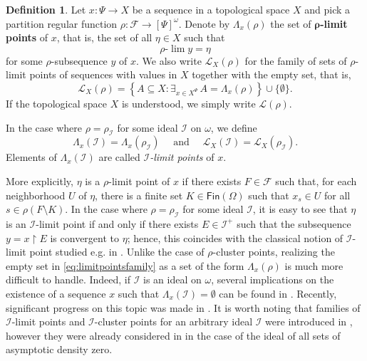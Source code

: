 \documentclass{amsart}
\theoremstyle{plain}
\theoremstyle{definition}
\newtheorem{defi}[thm]{Definition}
\theoremstyle{remark}
\newcommand{\cI}{\mathcal{I}}
\newcommand{\I}{\cI}
\newcommand{\FIN}{\mathsf{Fin}} \newcommand{\fin}{\FIN}
\newcommand{\Fin}{\FIN}
\begin{document}
\begin{defi}\label{defi:rholimitpoint}
Let $x: \Psi\to X$ be a sequence in a topological space $X$ 
and pick a partition regular function $\rho: \mathcal{F}\to [\Psi]^\omega$. 
Denote by 
$\Lambda_x(\rho)$ the set of $\bm{\rho}$\textbf{-limit points} of $x$, that is, the set of all $\eta \in X$ such that 
\begin{equation*}
    \rho\text{-}\lim y=\eta
\end{equation*}
for some $\rho$-subsequence $y$ of $x$. We also write $\mathscr{L}_X(\rho)$ for the family of sets of $\rho$-limit points of sequences with values in $X$ together with the empty set, that is, 
    \begin{equation}\label{eq:limitpointsfamily}
    \mathscr{L}_X(\rho)=\left\{A\subseteq X: \exists_{x \in X^\Psi}\, A=\Lambda_x(\rho)\right\}\cup \{\emptyset\}. 
    \end{equation}
    If the topological space $X$ is understood, we simply write $\mathscr{L}(\rho)$. 

In the case where $\rho=\rho_{\I}$ for some ideal $\I$ on $\omega$, we define 
\begin{equation*}
\Lambda_x(\I)=\Lambda_x(\rho_{\I})
\quad \text{ and }\quad 
\mathscr{L}_X(\I)=\mathscr{L}_X(\rho_{\I}).
\end{equation*}
Elements of $\Lambda_x(\I)$ are called $\I$\emph{-limit points} of $x$. 
\end{defi}

More explicitly, $\eta$ is a $\rho$-limit point of $x$ if there exists $F \in \mathcal{F}$ such that, for each neighborhood $U$ of $\eta$, there is a finite set $K \in \Fin(\Omega)$ such that $x_s \in U$ for all $s \in \rho(F\setminus K)$. In the case where $\rho=\rho_\I$ for some ideal $\I$, it is easy to see that $\eta$ is an $\I$-limit point 
if and only if there exists $E\in \I^+$ such that the subsequence $y=x\upharpoonright E$ is convergent to $\eta$; hence, this coincides with the classical notion of $\I$-limit point studied e.g. in \cite{MSP24, MR3883171, FKL24, MR3883170}. 
Unlike the case of $\rho$-cluster points, realizing the empty set 
in \eqref{eq:limitpointsfamily} 
as a set of the form $\Lambda_x(\rho)$ is much more difficult to handle. 
Indeed, if $\I$ is an ideal on $\omega$, several implications on the existence of a sequence $x$ such that $\Lambda_x(\I)=\emptyset$ can be found in \cite[Proposition 5.3 and Figure 3]{FKL24}. Recently, significant progress on this topic was made in \cite{Gosia}. 
It is worth noting that families of $\I$-limit points and $\I$-cluster points for an arbitrary ideal $\I$ were introduced  in \cite{MR1844385}, however they were already considered in \cite{MR1181163} in the case of the ideal of all sets of asymptotic density zero.
\end{document}
